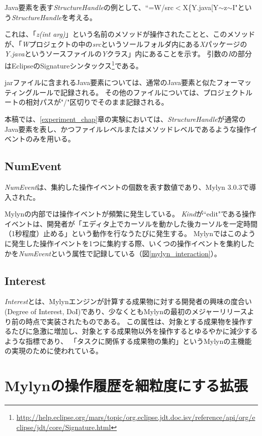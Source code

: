 \documentclass[a4paper]{jsbook}
\begin{document}
Java要素を表す{\it StructureHandle}の例として、``=W/src$<$X\{Y.java[Y$\sim$z$\sim$I"という{\it StructureHandle}を考える。

これは、「{\it z(int arg)}」という名前のメソッドが操作されたことと、このメソッドが、「{\it W}プロジェクトの中の{\it src}というソールフォルダ内にある{\it X}パッケージの{\it Y.java}というソースファイルの{\it Y}クラス」内にあることを示す。
引数の{\it I}の部分はEclipseのSignatureシンタックス\footnote{\url{http://help.eclipse.org/mars/topic/org.eclipse.jdt.doc.isv/reference/api/org/eclipse/jdt/core/Signature.html}}である。

jarファイルに含まれるJava要素については、通常のJava要素と似たフォーマッティングルールで記録される。
その他のファイルについては、プロジェクトルートの相対パスが"/"区切りでそのまま記録される。

本稿では、\ref{experiment_chap}章の実験においては、{\it StructureHandle}が通常のJava要素を表し、かつファイルレベルまたはメソッドレベルであるような操作イベントのみを用いる。

\section{NumEvent}
{\it NumEvent}は、集約した操作イベントの個数を表す数値であり、Mylyn 3.0.3で導入された。

Mylynの内部では操作イベントが頻繁に発生している。
{\it Kind}が``edit"である操作イベントは、開発者が「エディタ上でカーソルを動かした後カーソルを一定時間（1秒程度）止める」という動作を行なうたびに発生する。
Mylynではこのように発生した操作イベントを1つに集約する際、いくつの操作イベントを集約したかを{\it NumEvent}という属性で記録している（図\ref{mylyn_interaction}）。
\section{Interest}
{\it Interest}とは、Mylynエンジンが計算する成果物に対する開発者の興味の度合い(Degree of Interest, DoI)であり\cite{Kersten:2006}、少なくともMylynの最初のメジャーリリースより前の時点で実装されたものである。
この属性は、対象とする成果物を操作するたびに急激に増加し、対象とする成果物以外を操作するとゆるやかに減少するような指標であり、
「タスクに関係する成果物の集約」というMylynの主機能の実現のために使われている。

\chapter{Mylynの操作履歴を細粒度にする拡張}\label{mylynplus_chap}
\end{document}
